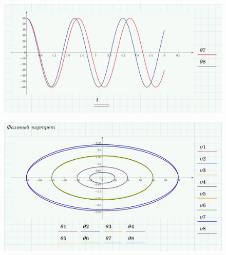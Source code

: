 \documentclass[a4paper, 14pt]{extarticle}
\begin{document}
		\begin{figure}[H]
			\centering
			\includegraphics[width = \linewidth]{8.jpg}
		\end{figure}	
		\begin{figure}[H]
			\centering
			\includegraphics[width = \linewidth]{9.jpg}
		\end{figure}
\end{document}
